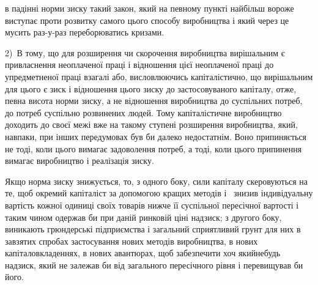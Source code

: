 \parcont{}  %
в падінні норми зиску такий закон, який на певному пункті
найбільш вороже виступає проти розвитку самого цього способу
виробництва і який через це мусить раз-у-раз переборюватись
кризами.

2)~В тому, що для розширення чи скорочення виробництва
вирішальним є привласнення неоплаченої праці і відношення цієї
неоплаченої праці до упредметненої праці взагалі або, висловлюючись
капіталістично, що вирішальним для цього є зиск
і відношення цього зиску до застосовуваного капіталу, отже,
певна висота норми зиску, а не відношення виробництва до
суспільних потреб, до потреб суспільно розвинених людей. Тому
капіталістичне виробництво доходить до своєї межі вже на
такому ступені розширення виробництва, який, навпаки, при
інших передумовах був би далеко недостатнім. Воно припиняється
не тоді, коли цього вимагає задоволення потреб, а тоді,
коли цього припинення вимагає виробництво і реалізація зиску.

Якщо норма зиску знижується, то, з одного боку, сили
капіталу скеровуються на те, щоб окремий капіталіст за допомогою
кращих методів і~ знизив індивідуальну вартість
кожної одиниці своїх товарів нижче її суспільної пересічної
вартості і таким чином одержав би при даній ринковій ціні
надзиск; з другого боку, виникають грюндерські підприємства
і загальний сприятливий грунт для них в завзятих спробах застосування
нових методів виробництва, в нових капіталовкладеннях,
в нових авантюрах, щоб забезпечити хоч якийнебудь
надзиск, який не залежав би від загального пересічного рівня
і перевищував би його.

